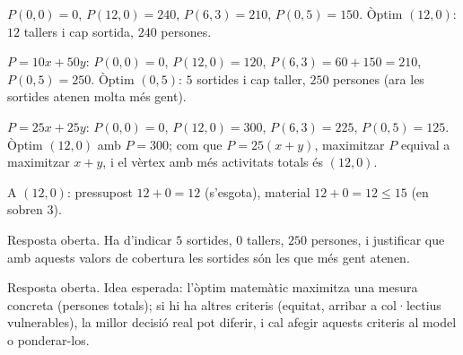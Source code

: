 \begin{solucions}
\begin{sollist}
  \item $P(0,0)=0$, $P(12,0)=240$, $P(6,3)=210$, $P(0,5)=150$. Òptim $(12,0)$: $12$
        tallers i cap sortida, $240$ persones.
  \item $P=10x+50y$: $P(0,0)=0$, $P(12,0)=120$, $P(6,3)=60+150=210$, $P(0,5)=250$.
        Òptim $(0,5)$: $5$ sortides i cap taller, $250$ persones (ara les sortides
        atenen molta més gent).
  \item $P=25x+25y$: $P(0,0)=0$, $P(12,0)=300$, $P(6,3)=225$, $P(0,5)=125$. Òptim
        $(12,0)$ amb $P=300$; com que $P=25(x+y)$, maximitzar $P$ equival a maximitzar
        $x+y$, i el vèrtex amb més activitats totals és $(12,0)$.
  \item A $(12,0)$: pressupost $12+0=12$ (s'esgota), material $12+0=12\le 15$ (en
        sobren $3$).
  \item Resposta oberta. Ha d'indicar $5$ sortides, $0$ tallers, $250$ persones, i
        justificar que amb aquests valors de cobertura les sortides són les que més
        gent atenen.
  \item Resposta oberta. Idea esperada: l'òptim matemàtic maximitza una mesura
        concreta (persones totals); si hi ha altres criteris (equitat, arribar a
        col·lectius vulnerables), la millor decisió real pot diferir, i cal afegir
        aquests criteris al model o ponderar-los.
\end{sollist}
\end{solucions}
